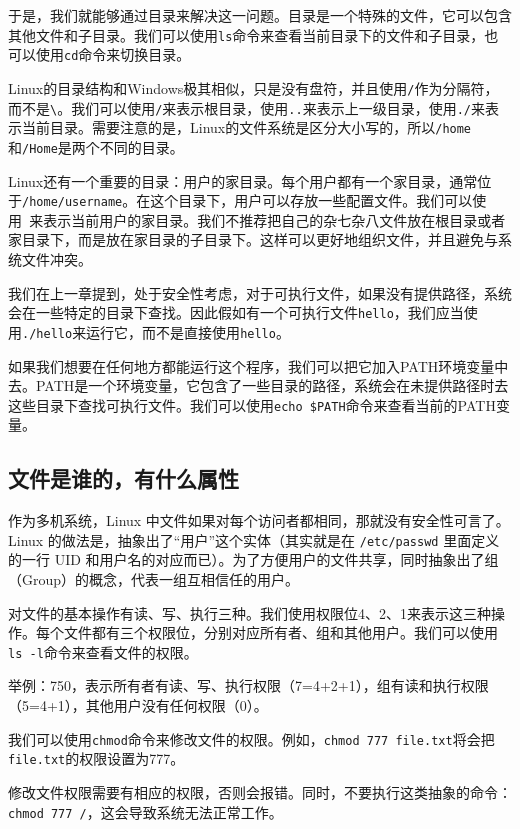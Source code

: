 \documentclass[../main.tex]{subfiles}
\begin{document}
于是，我们就能够通过目录来解决这一问题。目录是一个特殊的文件，它可以包含其他文件和子目录。我们可以使用\texttt{ls}命令来查看当前目录下的文件和子目录，也可以使用\texttt{cd}命令来切换目录。

Linux的目录结构和Windows极其相似，只是没有盘符，并且使用\texttt{/}作为分隔符，而不是\texttt{\textbackslash}。我们可以使用\texttt{/}来表示根目录，使用\texttt{..}来表示上一级目录，使用\texttt{./}来表示当前目录。需要注意的是，Linux的文件系统是区分大小写的，所以\texttt{/home}和\texttt{/Home}是两个不同的目录。

Linux还有一个重要的目录：用户的家目录。每个用户都有一个家目录，通常位于\texttt{/home/username}。在这个目录下，用户可以存放一些配置文件。我们可以使用\texttt{~}来表示当前用户的家目录。我们不推荐把自己的杂七杂八文件放在根目录或者家目录下，而是放在家目录的子目录下。这样可以更好地组织文件，并且避免与系统文件冲突。

我们在上一章提到，处于安全性考虑，对于可执行文件，如果没有提供路径，系统会在一些特定的目录下查找。因此假如有一个可执行文件\texttt{hello}，我们应当使用\texttt{./hello}来运行它，而不是直接使用\texttt{hello}。

如果我们想要在任何地方都能运行这个程序，我们可以把它加入PATH环境变量中去。PATH是一个环境变量，它包含了一些目录的路径，系统会在未提供路径时去这些目录下查找可执行文件。我们可以使用\texttt{echo \$PATH}命令来查看当前的PATH变量。

\subsection{文件是谁的，有什么属性}

作为多机系统，Linux 中文件如果对每个访问者都相同，那就没有安全性可言了。Linux 的做法是，抽象出了“用户”这个实体（其实就是在 \texttt{/etc/passwd} 里面定义的一行 UID 和用户名的对应而已）。为了方便用户的文件共享，同时抽象出了组（Group）的概念，代表一组互相信任的用户。

对文件的基本操作有读、写、执行三种。我们使用权限位4、2、1来表示这三种操作。每个文件都有三个权限位，分别对应所有者、组和其他用户。我们可以使用\texttt{ls -l}命令来查看文件的权限。

举例：750，表示所有者有读、写、执行权限（7=4+2+1），组有读和执行权限（5=4+1），其他用户没有任何权限（0）。

我们可以使用\texttt{chmod}命令来修改文件的权限。例如，\texttt{chmod 777 file.txt}将会把\texttt{file.txt}的权限设置为777。

\begin{tcolorbox}[title=注意]
  修改文件权限需要有相应的权限，否则会报错。同时，不要执行这类抽象的命令：\texttt{chmod 777 /}，这会导致系统无法正常工作。
\end{tcolorbox}
\end{document}
